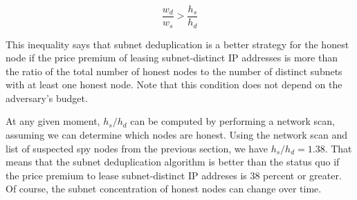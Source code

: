 \documentclass[usletter,11pt,english,openany]{article}
\begin{document}
\begin{equation}
\dfrac{w_{d}}{w_{s}}>\dfrac{h_{s}}{h_{d}}
\end{equation}

This inequality says that subnet deduplication is a better strategy
for the honest node if the price premium of leasing subnet-distinct
IP addresses is more than the ratio of the total number of honest
nodes to the number of distinct subnets with at least one honest node.
Note that this condition does not depend on the adversary's budget.

At any given moment, $h_{s}/h_{d}$ can be computed by performing
a network scan, assuming we can determine which nodes are honest.
Using the network scan and list of suspected spy nodes from the previous
section, we have $h_{s}/h_{d}=1.38$. That means that the subnet deduplication
algorithm is better than the status quo if the price premium to lease
subnet-distinct IP addreses is 38 percent or greater. Of course, the
subnet concentration of honest nodes can change over time.

\begin{singlespace}

\end{singlespace}
\end{document}
